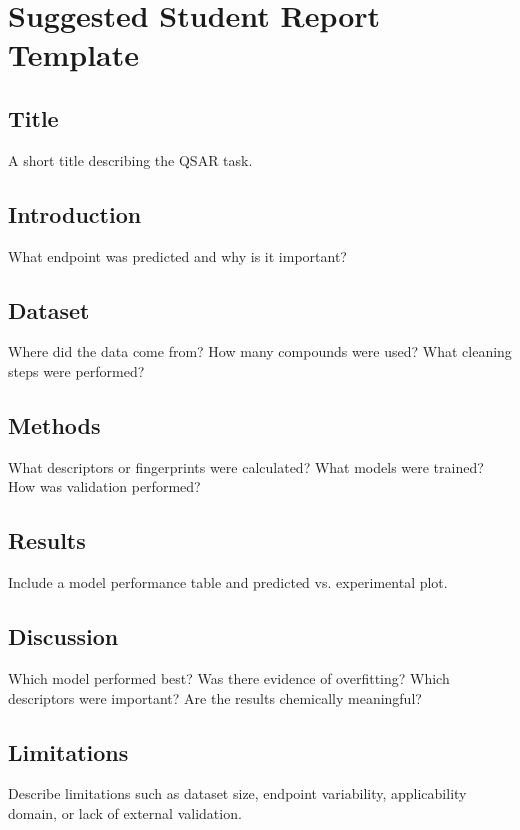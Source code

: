 \documentclass[11pt]{report}
\newenvironment{Important note}{\begin{quote}\color{red}\textbf{Important note:} }{\end{quote}}
\begin{document}
\chapter{Suggested Student Report Template}

\section*{Title}

A short title describing the QSAR task.

\section*{Introduction}

What endpoint was predicted and why is it important?

\section*{Dataset}

Where did the data come from? How many compounds were used? What cleaning steps were performed?

\section*{Methods}

What descriptors or fingerprints were calculated? What models were trained? How was validation performed?

\section*{Results}

Include a model performance table and predicted vs. experimental plot.

\section*{Discussion}

Which model performed best? Was there evidence of overfitting? Which descriptors were important? Are the results chemically meaningful?

\section*{Limitations}

Describe limitations such as dataset size, endpoint variability, applicability domain, or lack of external validation.
\end{document}
